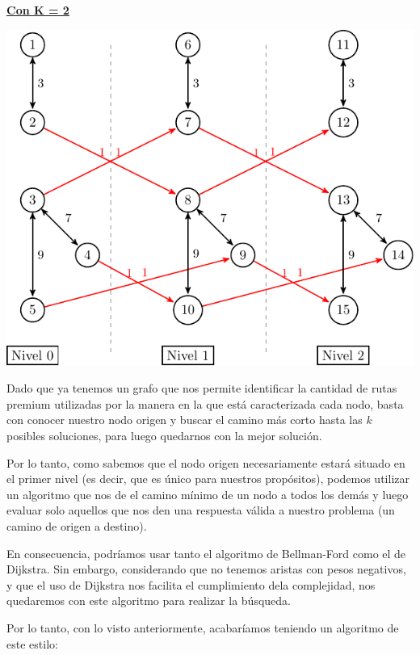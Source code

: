 \underline{\textbf{Con K = 2}}
\\
\begin{center}
\includegraphics[scale=0.75]{imagenes/ej1_ex_k2.pdf}
\\
\end{center}
Dado que ya tenemos un grafo que nos permite identificar la cantidad de rutas premium utilizadas por la manera en la que está caracterizada cada nodo, basta con conocer nuestro nodo origen y buscar el camino más corto hasta las $k$ posibles soluciones, para luego quedarnos con la mejor solución.
\\
\par
Por lo tanto, como sabemos que el nodo origen necesariamente estará situado en el primer nivel (es decir, que es único para nuestros propósitos), podemos utilizar un algoritmo que nos de el camino mínimo de un nodo a todos los demás y luego evaluar solo aquellos que nos den una respuesta válida a nuestro problema (un camino de origen a destino).
\\
\par
En consecuencia, podríamos usar tanto el algoritmo de Bellman-Ford como el de Dijkstra. Sin embargo, considerando que no tenemos aristas con pesos negativos, y que el uso de Dijkstra nos facilita el cumplimiento dela complejidad, nos quedaremos con este algoritmo para realizar la búsqueda.
\\
\par
Por lo tanto, con lo visto anteriormente, acabaríamos teniendo un algoritmo de este estilo:
\\
